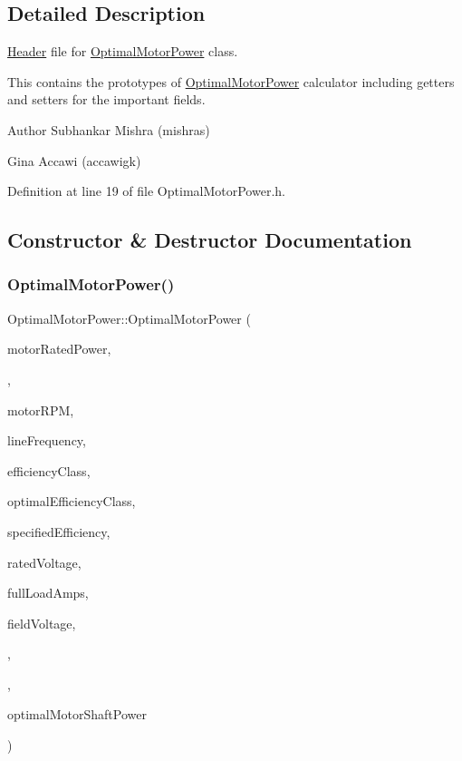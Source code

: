\subsection{Detailed Description}
\hyperlink{class_header}{Header} file for \hyperlink{class_optimal_motor_power}{Optimal\+Motor\+Power} class. 

This contains the prototypes of \hyperlink{class_optimal_motor_power}{Optimal\+Motor\+Power} calculator including getters and setters for the important fields.

\begin{DoxyAuthor}{Author}
Subhankar Mishra (mishras) 

Gina Accawi (accawigk) 
\end{DoxyAuthor}


Definition at line 19 of file Optimal\+Motor\+Power.\+h.



\subsection{Constructor \& Destructor Documentation}
\mbox{\label{class_optimal_motor_power_a655953d8e84d386a6e5ea4044098dcc0}} 
\subsubsection{\texorpdfstring{Optimal\+Motor\+Power()}{OptimalMotorPower()}}
{\footnotesize\ttfamily Optimal\+Motor\+Power\+::\+Optimal\+Motor\+Power (\begin{DoxyParamCaption}\item[{double}]{motor\+Rated\+Power,  }\item[{double}]{,  }\item[{int}]{motor\+R\+PM,  }\item[{\hyperlink{class_motor_acee1bdf1b684ad36cb80dc2829d9fcee}{Motor\+::\+Line\+Frequency}}]{line\+Frequency,  }\item[{\hyperlink{class_motor_afa022971ae062406a9f588c601673d4e}{Motor\+::\+Efficiency\+Class}}]{efficiency\+Class,  }\item[{\hyperlink{class_motor_afa022971ae062406a9f588c601673d4e}{Motor\+::\+Efficiency\+Class}}]{optimal\+Efficiency\+Class,  }\item[{double}]{specified\+Efficiency,  }\item[{double}]{rated\+Voltage,  }\item[{double}]{full\+Load\+Amps,  }\item[{double}]{field\+Voltage,  }\item[{\hyperlink{class_field_data_a424e89914ba5684c01bb269dbe3312fd}{Field\+Data\+::\+Load\+Estimation\+Method}}]{,  }\item[{double}]{,  }\item[{double}]{optimal\+Motor\+Shaft\+Power }\end{DoxyParamCaption})\hspace{0.3cm}{\ttfamily [inline]}}

